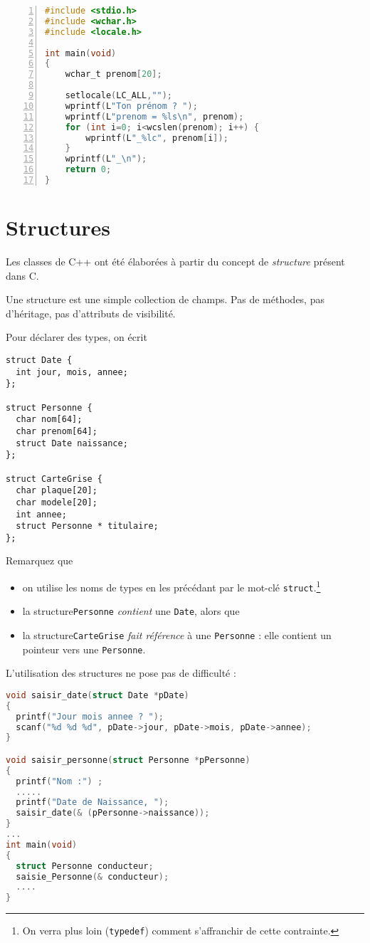 \documentclass[10pt]{article}
\begin{document}
\begin{lstlisting}[frame=single,language=C,numbers=left]
#include <stdio.h>
#include <wchar.h>
#include <locale.h>

int main(void)
{
	wchar_t prenom[20];
	
	setlocale(LC_ALL,"");
	wprintf(L"Ton prénom ? ");
	wprintf(L"prenom = %ls\n", prenom);
	for (int i=0; i<wcslen(prenom); i++) {
		wprintf(L"_%lc", prenom[i]);
	}
	wprintf(L"_\n");
	return 0;
}
\end{lstlisting}

\section{Structures}

Les classes de C++ ont été élaborées à partir du concept de
\emph{structure} présent dans C.

Une structure est une simple collection de champs. Pas de méthodes,
pas d'héritage, pas d'attributs de visibilité.

Pour déclarer des types, on écrit
\begin{lstlisting}
struct Date {
  int jour, mois, annee;
};

struct Personne {
  char nom[64];
  char prenom[64];
  struct Date naissance;
};

struct CarteGrise {
  char plaque[20];
  char modele[20];
  int annee;
  struct Personne * titulaire;
};
\end{lstlisting}

Remarquez que
\begin{itemize}
\item on utilise les noms de types en les précédant par le mot-clé
  \texttt{struct}.\footnote{On verra plus loin (\texttt{typedef}) comment
  s'affranchir de cette contrainte.}
\item la structure\texttt{Personne} \emph{contient} une \texttt{Date}, alors que
\item la structure\texttt{CarteGrise} \emph{fait référence} à une \texttt{Personne} : elle contient un pointeur vers une \texttt{Personne}.
\end{itemize}

L'utilisation des structures ne pose pas de difficulté :
\begin{lstlisting}[language=C]
void saisir_date(struct Date *pDate)
{
  printf("Jour mois annee ? ");
  scanf("%d %d %d", pDate->jour, pDate->mois, pDate->annee);
}

void saisir_personne(struct Personne *pPersonne)
{
  printf("Nom :") ;
  .....
  printf("Date de Naissance, ");
  saisir_date(& (pPersonne->naissance));
}
...
int main(void) 
{
  struct Personne conducteur;
  saisie_Personne(& conducteur);
  ....
}
\end{lstlisting}
\end{document}
